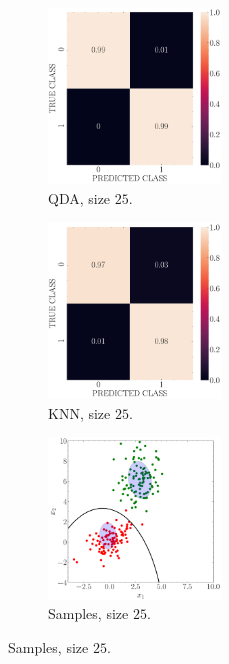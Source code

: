 \documentclass[12pt, a4 paper]{article}
\begin{document}
\begin{figure}[!htbp]
\quad \quad   
    \begin{subfigure}[!htbp]{0.24\textwidth}
       \centering
       \includegraphics[width=1.8in]{../results/ex1/conf_mtx_QD_ML_dataset_P1c_size_25.pdf}
       \caption{QDA, size $25$.}
       \label{fig:KNN_P1c_25}
    \end{subfigure}
\quad \quad
    \begin{subfigure}[!htbp]{0.24\textwidth}
       \centering
       \includegraphics[width=1.8in]{../results/ex1/conf_mtx_KNN_dataset_P1c_size_25.pdf}
       \caption{KNN, size $25$.}
       \label{fig:KNN_P1c_25}
    \end{subfigure}
\quad \quad
    \begin{subfigure}[!htbp]{0.24\textwidth}
       \centering
       \includegraphics[width=1.8in]{../results/ex1/samples_QD_ML_dataset_P1c_size_25.pdf}
       \caption{Samples, size $25$.}
       \label{fig:KNN_P1c_25}
    \end{subfigure}
    

\end{figure}
\end{document}
